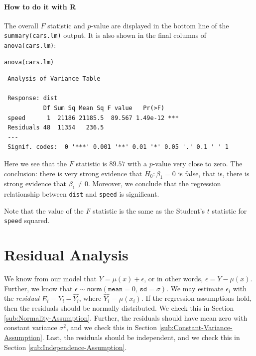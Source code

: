 \documentclass[captions=tableheading]{scrbook}
\begin{document}
\paragraph*{How to do it with \textsf{R}}

The overall \(F\) statistic and \(p\)-value are displayed in the bottom line of the \texttt{summary(cars.lm)} output. It is also shown in the final columns of \texttt{anova(cars.lm)}:


\begin{verbatim}
anova(cars.lm)
\end{verbatim}

\begin{verbatim}
 Analysis of Variance Table
 
 Response: dist
           Df Sum Sq Mean Sq F value   Pr(>F)    
 speed      1  21186 21185.5  89.567 1.49e-12 ***
 Residuals 48  11354   236.5                     
 ---
 Signif. codes:  0 '***' 0.001 '**' 0.01 '*' 0.05 '.' 0.1 ' ' 1
\end{verbatim}



Here we see that the \(F\) statistic is \(  89.57 \) with a \(p\)-value very close to zero. The conclusion: there is very strong evidence that \(H_{0}:\beta_{1} = 0 \) is false, that is, there is strong evidence that \( \beta_{1} \neq 0 \). Moreover, we conclude that the regression relationship between \texttt{dist} and \texttt{speed} is significant.

Note that the value of the \(F\) statistic is the same as the Student's \(t\) statistic for \texttt{speed} squared.
\section{Residual Analysis}
\label{sec-11-4}

\label{sec:Residual-Analysis-SLR}

We know from our model that \(Y=\mu(x)+\epsilon\), or in other words, \(\epsilon=Y-\mu(x)\). Further, we know that \(\epsilon\sim\mathsf{norm}(\mathtt{mean}=0,\,\mathtt{sd}=\sigma)\). We may estimate \(\epsilon_{i}\) with the \emph{residual} \(E_{i}=Y_{i}-\hat{Y_{i}}\), where \(\hat{Y_{i}}=\hat{\mu}(x_{i})\). If the regression assumptions hold, then the residuals should be normally distributed. We check this in Section \ref{sub:Normality-Assumption}. Further, the residuals should have mean zero with constant variance \(\sigma^{2}\), and we check this in Section \ref{sub:Constant-Variance-Assumption}. Last, the residuals should be independent, and we check this in Section \ref{sub:Independence-Assumption}.
\end{document}
